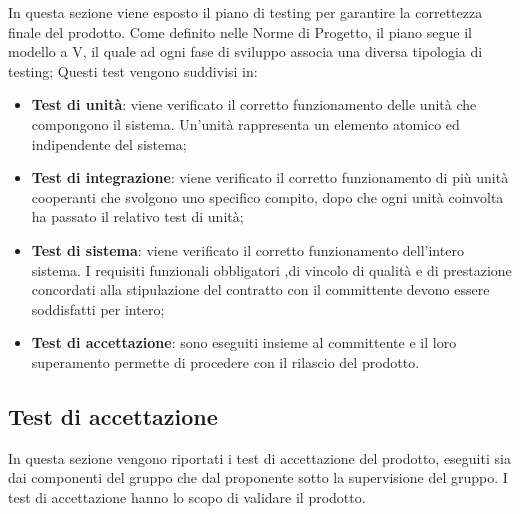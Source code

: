 In questa sezione viene esposto il piano di testing per garantire la correttezza finale del prodotto. 
Come definito nelle Norme di Progetto, il piano segue il modello a V, il quale ad ogni fase di sviluppo associa una diversa tipologia di testing; Questi test vengono suddivisi in:

\begin{itemize}
	\item \textbf{Test di unità}: viene verificato il corretto funzionamento delle unità che compongono il sistema. Un'unità rappresenta un elemento atomico ed indipendente del sistema;
	\item \textbf{Test di integrazione}: viene verificato il corretto funzionamento di più unità cooperanti che svolgono uno specifico compito, dopo che ogni unità coinvolta ha passato il relativo test di unità;
	\item \textbf{Test di sistema}: viene verificato il corretto funzionamento dell'intero sistema. I requisiti funzionali obbligatori ,di vincolo di qualità e di prestazione concordati alla stipulazione del contratto con il committente devono essere soddisfatti per intero;
	\item \textbf{Test di accettazione}: sono eseguiti insieme al  committente e il loro superamento permette di procedere con il rilascio del prodotto. 
\end{itemize}

\subsection{Test di accettazione}

In questa sezione vengono riportati i test di accettazione del prodotto, eseguiti sia dai componenti del gruppo che dal proponente sotto la supervisione del gruppo. I test di accettazione hanno lo scopo di validare il prodotto.

